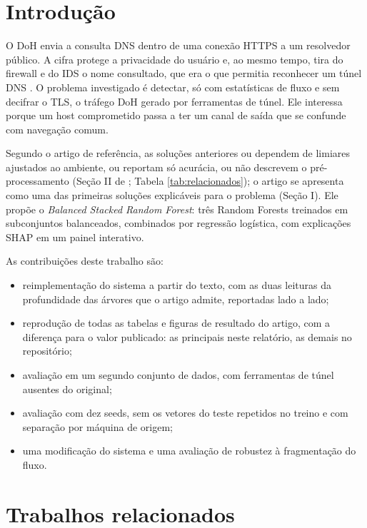 \documentclass[conference]{IEEEtran}
\begin{document}
\IEEEpeerreviewmaketitle

\section{Introdução}

O DoH envia a consulta DNS dentro de uma conexão HTTPS a um resolvedor público. A cifra protege a privacidade do usuário e, ao mesmo tempo, tira do firewall e do IDS o nome consultado, que era o que permitia reconhecer um túnel DNS \cite{zebin2022}. O problema investigado é detectar, só com estatísticas de fluxo e sem decifrar o TLS, o tráfego DoH gerado por ferramentas de túnel. Ele interessa porque um host comprometido passa a ter um canal de saída que se confunde com navegação comum.

Segundo o artigo de referência, as soluções anteriores ou dependem de limiares ajustados ao ambiente, ou reportam só acurácia, ou não descrevem o pré-processamento (Seção II de \cite{zebin2022}; Tabela \ref{tab:relacionados}); o artigo se apresenta como uma das primeiras soluções explicáveis para o problema (Seção I). Ele propõe o \textit{Balanced Stacked Random Forest}: três Random Forests treinados em subconjuntos balanceados, combinados por regressão logística, com explicações SHAP \cite{lundberg2017} em um painel interativo.

As contribuições deste trabalho são:
\begin{itemize}
    \item reimplementação do sistema a partir do texto, com as duas leituras da profundidade das árvores que o artigo admite, reportadas lado a lado;
    \item reprodução de todas as tabelas e figuras de resultado do artigo, com a diferença para o valor publicado: as principais neste relatório, as demais no repositório;
    \item avaliação em um segundo conjunto de dados, com ferramentas de túnel ausentes do original;
    \item avaliação com dez seeds, sem os vetores do teste repetidos no treino e com separação por máquina de origem;
    \item uma modificação do sistema e uma avaliação de robustez à fragmentação do fluxo.
\end{itemize}

\section{Trabalhos relacionados}
\end{document}
